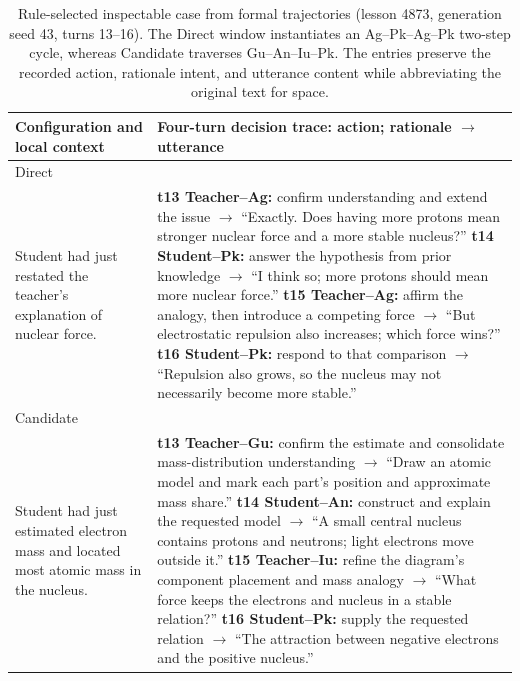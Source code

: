 \documentclass[manuscript,review,anonymous]{acmart}
\begin{document}
\begin{table}[t]
\centering
\footnotesize
\begin{tabularx}{\textwidth}{@{}>{\raggedright\arraybackslash}p{}>{\raggedright\arraybackslash}X@{}}
\toprule
Configuration and local context & Four-turn decision trace: action; rationale $\rightarrow$ utterance \\
\midrule
Direct\\
Student had just restated the teacher's explanation of nuclear force.
& \textbf{t13 Teacher--Ag:} confirm understanding and extend the issue $\rightarrow$
``Exactly. Does having more protons mean stronger nuclear force and a more stable nucleus?''
\newline \textbf{t14 Student--Pk:} answer the hypothesis from prior knowledge $\rightarrow$
``I think so; more protons should mean more nuclear force.''
\newline \textbf{t15 Teacher--Ag:} affirm the analogy, then introduce a competing force $\rightarrow$
``But electrostatic repulsion also increases; which force wins?''
\newline \textbf{t16 Student--Pk:} respond to that comparison $\rightarrow$
``Repulsion also grows, so the nucleus may not necessarily become more stable.'' \\
\addlinespace
Candidate\\
Student had just estimated electron mass and located most atomic mass in the nucleus.
& \textbf{t13 Teacher--Gu:} confirm the estimate and consolidate mass-distribution understanding $\rightarrow$
``Draw an atomic model and mark each part's position and approximate mass share.''
\newline \textbf{t14 Student--An:} construct and explain the requested model $\rightarrow$
``A small central nucleus contains protons and neutrons; light electrons move outside it.''
\newline \textbf{t15 Teacher--Iu:} refine the diagram's component placement and mass analogy $\rightarrow$
``What force keeps the electrons and nucleus in a stable relation?''
\newline \textbf{t16 Student--Pk:} supply the requested relation $\rightarrow$
``The attraction between negative electrons and the positive nucleus.'' \\
\bottomrule
\end{tabularx}
\caption{Rule-selected inspectable case from formal trajectories (lesson 4873,
generation seed 43, turns 13--16). The Direct window instantiates an
Ag--Pk--Ag--Pk two-step cycle, whereas Candidate traverses Gu--An--Iu--Pk.
The entries preserve the recorded action, rationale intent, and utterance
content while abbreviating the original text for space.}
\label{tab:trajectory-example}
\end{table}
\end{document}

